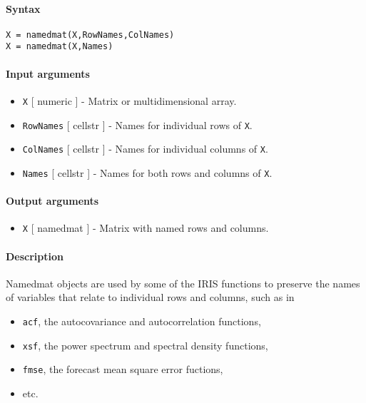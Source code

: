 


	\paragraph{Syntax}

\begin{verbatim}
X = namedmat(X,RowNames,ColNames)
X = namedmat(X,Names)
\end{verbatim}

\paragraph{Input arguments}

\begin{itemize}
\item
  \texttt{X} {[} numeric {]} - Matrix or multidimensional array.
\item
  \texttt{RowNames} {[} cellstr {]} - Names for individual rows of
  \texttt{X}.
\item
  \texttt{ColNames} {[} cellstr {]} - Names for individual columns of
  \texttt{X}.
\item
  \texttt{Names} {[} cellstr {]} - Names for both rows and columns of
  \texttt{X}.
\end{itemize}

\paragraph{Output arguments}

\begin{itemize}
\itemsep1pt\parskip0pt
\item
  \texttt{X} {[} namedmat {]} - Matrix with named rows and columns.
\end{itemize}

\paragraph{Description}

Namedmat objects are used by some of the IRIS functions to preserve the
names of variables that relate to individual rows and columns, such as
in

\begin{itemize}
\itemsep1pt\parskip0pt
\item
  \texttt{acf}, the autocovariance and autocorrelation functions,
\item
  \texttt{xsf}, the power spectrum and spectral density functions,
\item
  \texttt{fmse}, the forecast mean square error fuctions,
\item
  etc.
\end{itemize}

